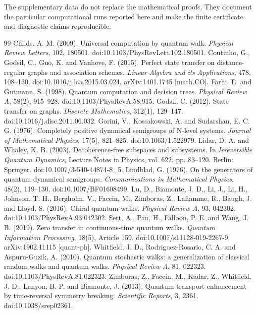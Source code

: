 \documentclass[11pt]{article}
\theoremstyle{definition}
\begin{document}
The supplementary data do not replace the mathematical proofs. They document the particular computational runs reported here and make the finite certificate and diagnostic claims reproducible.

\begin{thebibliography}{99}
 Childs, A. M. (2009). Universal computation by quantum walk. \emph{Physical Review Letters}, 102, 180501. doi:10.1103/PhysRevLett.102.180501.
 Coutinho, G., Godsil, C., Guo, K. and Vanhove, F. (2015). Perfect state transfer on distance-regular graphs and association schemes. \emph{Linear Algebra and its Applications}, 478, 108--130. doi:10.1016/j.laa.2015.03.024. arXiv:1401.1745 [math.CO].
 Farhi, E. and Gutmann, S. (1998). Quantum computation and decision trees. \emph{Physical Review A}, 58(2), 915--928. doi:10.1103/PhysRevA.58.915.
 Godsil, C. (2012). State transfer on graphs. \emph{Discrete Mathematics}, 312(1), 129--147. doi:10.1016/j.disc.2011.06.032.
 Gorini, V., Kossakowski, A. and Sudarshan, E. C. G. (1976). Completely positive dynamical semigroups of N-level systems. \emph{Journal of Mathematical Physics}, 17(5), 821--825. doi:10.1063/1.522979.
 Lidar, D. A. and Whaley, K. B. (2003). Decoherence-free subspaces and subsystems. In \emph{Irreversible Quantum Dynamics}, Lecture Notes in Physics, vol. 622, pp. 83--120. Berlin: Springer. doi:10.1007/3-540-44874-8\_5.
 Lindblad, G. (1976). On the generators of quantum dynamical semigroups. \emph{Communications in Mathematical Physics}, 48(2), 119--130. doi:10.1007/BF01608499.
 Lu, D., Biamonte, J. D., Li, J., Li, H., Johnson, T. H., Bergholm, V., Faccin, M., Zimboras, Z., Laflamme, R., Baugh, J. and Lloyd, S. (2016). Chiral quantum walks. \emph{Physical Review A}, 93, 042302. doi:10.1103/PhysRevA.93.042302.
 Sett, A., Pan, H., Falloon, P. E. and Wang, J. B. (2019). Zero transfer in continuous-time quantum walks. \emph{Quantum Information Processing}, 18(5), Article 159. doi:10.1007/s11128-019-2267-9. arXiv:1902.11115 [quant-ph].
 Whitfield, J. D., Rodriguez-Rosario, C. A. and Aspuru-Guzik, A. (2010). Quantum stochastic walks: a generalization of classical random walks and quantum walks. \emph{Physical Review A}, 81, 022323. doi:10.1103/PhysRevA.81.022323.
 Zimboras, Z., Faccin, M., Kadar, Z., Whitfield, J. D., Lanyon, B. P. and Biamonte, J. (2013). Quantum transport enhancement by time-reversal symmetry breaking. \emph{Scientific Reports}, 3, 2361. doi:10.1038/srep02361.
\end{thebibliography}
\end{document}
